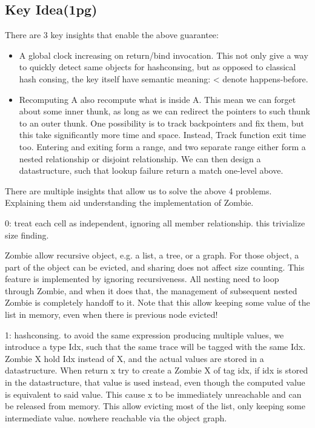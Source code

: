 \subsection{Key Idea(1pg)}

There are 3 key insights that enable the above guarantee:
\begin{itemize}
	\item A global clock increasing on return/bind invocation. This not only give a way to quickly detect same objects for hashconsing, but as opposed to classical hash consing, the key itself have semantic meaning: < denote happens-before.
	\item Recomputing A also recompute what is inside A. This mean we can forget about some inner thunk, as long as we can redirect the pointers to such thunk to an outer thunk. One possibility is to track backpointers and fix them, but this take significantly more time and space. Instead, Track function exit time too. Entering and exiting form a range, and two separate range either form a nested relationship or disjoint relationship. We can then design a datastructure, such that lookup failure return a match one-level above.
\end{itemize}


There are multiple insights that allow us to solve the above 4 problems. Explaining them aid understanding the implementation of Zombie.

0: treat each cell as independent, ignoring all member relationship.
this trivialize size finding.

Zombie allow recursive object, e.g. a list, a tree, or a graph.
For those object, a part of the object can be evicted, and sharing does not affect size counting.
This feature is implemented by ignoring recursiveness. All nesting need to loop through Zombie, and when it does that, the management of subsequent nested Zombie is completely handoff to it.
Note that this allow keeping some value of the list in memory, even when there is previous node evicted!

1: hashconsing. to avoid the same expression producing multiple values, we introduce a type Idx, such that the same trace will be tagged with the same Idx.
Zombie X hold Idx instead of X, and the actual values are stored in a datastructure.
When return x try to create a Zombie X of tag idx, if idx is stored in the datastructure, that value is used instead, even though the computed value is equivalent to said value. This cause x to be immediately unreachable and can be released from memory. This allow evicting most of the list, only keeping some intermediate value. nowhere reachable via the object graph.


